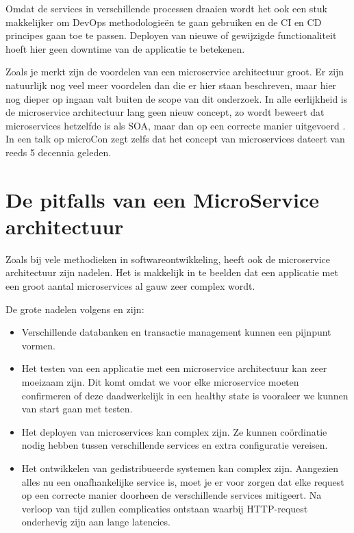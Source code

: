 Omdat de services in verschillende processen draaien wordt het ook een stuk makkelijker om DevOps methodologieën te gaan gebruiken en de \gls{CI} en \gls{CD} principes gaan toe te passen. Deployen van nieuwe of gewijzigde functionaliteit hoeft hier geen downtime van de applicatie te betekenen.

Zoals je merkt zijn de voordelen van een microservice architectuur groot. Er zijn natuurlijk nog veel meer voordelen dan die er hier staan beschreven, maar hier nog dieper op ingaan valt buiten de scope van dit onderzoek. In alle eerlijkheid is de microservice architectuur lang geen nieuw concept, zo  wordt beweert dat microservices hetzelfde is als \gls{SOA}, maar dan op een correcte manier uitgevoerd \autocite{Morris2014} \autocite{Young2016}. In een talk op microCon zegt \textcite{Young2016} zelfs dat het concept van microservices dateert van reeds 5 decennia geleden.

\section{De pitfalls van een MicroService architectuur}
Zoals bij vele methodieken in softwareontwikkeling, heeft ook de microservice architectuur zijn nadelen. Het is makkelijk in te beelden dat een applicatie met een groot aantal microservices al gauw zeer complex wordt.

De grote nadelen volgens \textcite{Fowler2015} en \textcite{Hummel2018} zijn:

\begin{itemize}
	\item Verschillende databanken en transactie management kunnen een pijnpunt vormen.
	\item Het testen van een applicatie met een microservice architectuur kan zeer moeizaam zijn. Dit komt omdat we voor elke microservice moeten confirmeren of deze daadwerkelijk in een healthy state is vooraleer we kunnen van start gaan met testen.
	\item Het deployen van microservices kan complex zijn. Ze kunnen coördinatie nodig hebben tussen verschillende services en extra configuratie vereisen.
	\item Het ontwikkelen van \gls{gedistribueerde systemen} kan complex zijn. Aangezien alles nu een onafhankelijke service is, moet je er voor zorgen dat elke request op een correcte manier doorheen de verschillende services mitigeert. Na verloop van tijd zullen complicaties ontstaan waarbij \gls{HTTP-request} onderhevig zijn aan lange latencies.
\end{itemize}

